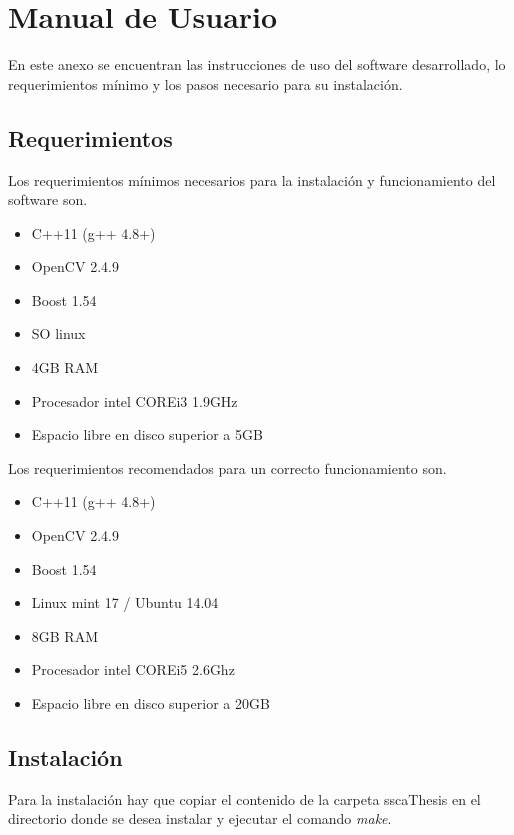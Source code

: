 
\chapter{Manual de Usuario}
\label{cap:manual}

En este anexo se encuentran las instrucciones de uso del software desarrollado, lo requerimientos mínimo y los pasos necesario para su instalación.

\section{Requerimientos}

Los requerimientos mínimos necesarios para la instalación y funcionamiento del software son.

\begin{itemize}
\item C++11 (g++ 4.8+)
\item OpenCV 2.4.9
\item Boost 1.54
\item SO linux
\item 4GB RAM
\item Procesador intel COREi3 1.9GHz
\item Espacio libre en disco superior a 5GB
\end{itemize}

Los requerimientos recomendados para un correcto funcionamiento son.

\begin{itemize}
\item C++11 (g++ 4.8+)
\item OpenCV 2.4.9
\item Boost 1.54
\item Linux mint 17 / Ubuntu 14.04
\item 8GB RAM
\item Procesador intel COREi5 2.6Ghz
\item Espacio libre en disco superior a 20GB
\end{itemize}


\section{Instalaci\'on}

Para la instalación hay que copiar el contenido de la carpeta sscaThesis en el directorio donde se desea instalar y ejecutar el comando \textit{make}.

